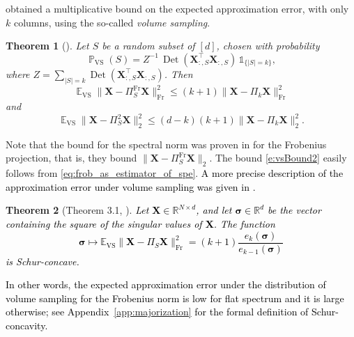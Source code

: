 \documentclass[twoside,11pt]{book}
\newcommand{\rev}[1]{\textcolor{black}{#1}}
\newtheorem{theorem}{Theorem}
\numberwithin{theorem}{chapter}
\numberwithin{definition}{chapter}
\numberwithin{proposition}{chapter}
\numberwithin{corollary}{chapter}
\numberwithin{example}{chapter}
\numberwithin{lemma}{chapter}
\numberwithin{assumption}{chapter}
\numberwithin{equation}{chapter}
\numberwithin{figure}{chapter}
\DeclareMathOperator{\Det}{Det}
\DeclareMathOperator{\Fr}{\mathrm{Fr}}
\DeclareMathOperator{\VS}{\mathrm{VS}}
\DeclareMathOperator{\Tran}{\intercal}
\DeclareMathOperator{\EX}{\mathbb{E}}
\DeclareMathOperator{\Prb}{\mathbb{P}}
\begin{document}
 \citet*{DRVW06} obtained a multiplicative bound on the expected approximation error, with only $k$ columns, using the so-called \emph{volume sampling}.
\begin{theorem}[\citealp{DRVW06}]
  \label{thrm:volume_sampling_theorem}
Let $S$ be a random subset of $[d]$, chosen with probability
\begin{equation}
\Prb_{\VS}(S) = Z^{-1} \,\Det(\bm{X}_{:,S}^{\Tran}\bm{X}_{:,S}^{})\, \mathbb{1}_{\{|S| = k \}},
\label{e:vs}
\end{equation}
where $Z = \sum\limits_{|S| = k} \Det(\bm{X}_{:,S}^{\Tran}\bm{X}_{:,S}^{})$.
Then
\begin{equation}
\EX_{\VS} \| \bm{X} - \Pi_{S}^{\Fr}\bm{X} \|_{\Fr}^{2} \leq (k+1)\| \bm{X} - \Pi_{k}\bm{X} \|_{\Fr}^{2}
\label{e:vsBoundFr}
\end{equation}
and
\begin{equation}
\EX_{\VS} \| \bm{X} - \Pi_{S}^{2}\bm{X} \|_{2}^{2} \leq (d-k)(k+1)\| \bm{X} - \Pi_{k}\bm{X} \|_{2}^{2} .
\label{e:vsBound2}
\end{equation}
\end{theorem}
Note that the bound for the spectral norm was proven in \cite{DRVW06} for the Frobenius projection, that is, they bound $\| \bm{X} - \Pi_{S}^{\Fr}\bm{X} \|_{2}$. The bound \eqref{e:vsBound2} easily follows from \eqref{eq:frob_as_estimator_of_spe}. \rev{A more precise description of the approximation error under volume sampling was given in \cite{GuSi12}.}
\begin{theorem}[Theorem 3.1, \citealp{GuSi12}]\label{thm:schur_convex_volume_sampling}
\rev{Let $\bm{X} \in \mathbb{R}^{N \times d}$, and let $\bm{\sigma}\in \mathbb{R}^{d}$ be the vector containing the square of the singular values of $\bm{X}$. The function
\begin{equation}
\bm{\sigma} \mapsto \mathbb{E}_{\VS} \|\bm{X}- \Pi_{S} \bm{X}\|_{\Fr}^{2} = (k+1)\frac{e_{k}(\bm{\sigma})}{e_{k-1}(\bm{\sigma})}
\end{equation}
is Schur-concave.}
\end{theorem}
\rev{In other words, the expected approximation error under the distribution of volume sampling for the Frobenius norm is low for flat spectrum and it is large otherwise; see Appendix~\ref{app:majorization} for the formal definition of Schur-concavity.}
\end{document}
